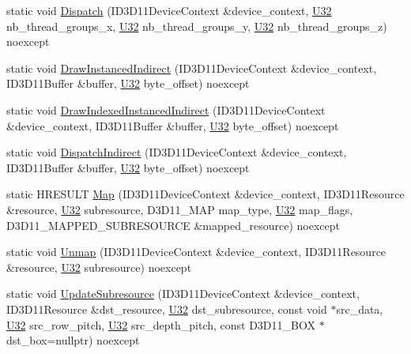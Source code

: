 \begin{DoxyCompactItemize}
\item 
static void \mbox{\hyperlink{structmage_1_1rendering_1_1_pipeline_a96bbf2861a3d4c10ba87c6b6f5228595}{Dispatch}} (I\+D3\+D11\+Device\+Context \&device\+\_\+context, \mbox{\hyperlink{namespacemage_a41c104c036fba3756a74e19f793eeaa1}{U32}} nb\+\_\+thread\+\_\+groups\+\_\+x, \mbox{\hyperlink{namespacemage_a41c104c036fba3756a74e19f793eeaa1}{U32}} nb\+\_\+thread\+\_\+groups\+\_\+y, \mbox{\hyperlink{namespacemage_a41c104c036fba3756a74e19f793eeaa1}{U32}} nb\+\_\+thread\+\_\+groups\+\_\+z) noexcept
\item 
static void \mbox{\hyperlink{structmage_1_1rendering_1_1_pipeline_acfdf1d2aba1e8c0db9c4ef9e9730f31c}{Draw\+Instanced\+Indirect}} (I\+D3\+D11\+Device\+Context \&device\+\_\+context, I\+D3\+D11\+Buffer \&buffer, \mbox{\hyperlink{namespacemage_a41c104c036fba3756a74e19f793eeaa1}{U32}} byte\+\_\+offset) noexcept
\item 
static void \mbox{\hyperlink{structmage_1_1rendering_1_1_pipeline_a51e2744827cbcf7791fcb40c0131d11b}{Draw\+Indexed\+Instanced\+Indirect}} (I\+D3\+D11\+Device\+Context \&device\+\_\+context, I\+D3\+D11\+Buffer \&buffer, \mbox{\hyperlink{namespacemage_a41c104c036fba3756a74e19f793eeaa1}{U32}} byte\+\_\+offset) noexcept
\item 
static void \mbox{\hyperlink{structmage_1_1rendering_1_1_pipeline_aceae5a9f2d24336e4424208a8e037a82}{Dispatch\+Indirect}} (I\+D3\+D11\+Device\+Context \&device\+\_\+context, I\+D3\+D11\+Buffer \&buffer, \mbox{\hyperlink{namespacemage_a41c104c036fba3756a74e19f793eeaa1}{U32}} byte\+\_\+offset) noexcept
\item 
static H\+R\+E\+S\+U\+LT \mbox{\hyperlink{structmage_1_1rendering_1_1_pipeline_ab0176557cd5473bf5cd77836ca2d924f}{Map}} (I\+D3\+D11\+Device\+Context \&device\+\_\+context, I\+D3\+D11\+Resource \&resource, \mbox{\hyperlink{namespacemage_a41c104c036fba3756a74e19f793eeaa1}{U32}} subresource, D3\+D11\+\_\+\+M\+AP map\+\_\+type, \mbox{\hyperlink{namespacemage_a41c104c036fba3756a74e19f793eeaa1}{U32}} map\+\_\+flags, D3\+D11\+\_\+\+M\+A\+P\+P\+E\+D\+\_\+\+S\+U\+B\+R\+E\+S\+O\+U\+R\+CE \&mapped\+\_\+resource) noexcept
\item 
static void \mbox{\hyperlink{structmage_1_1rendering_1_1_pipeline_ac4ad95111168cc62686da885da9ab161}{Unmap}} (I\+D3\+D11\+Device\+Context \&device\+\_\+context, I\+D3\+D11\+Resource \&resource, \mbox{\hyperlink{namespacemage_a41c104c036fba3756a74e19f793eeaa1}{U32}} subresource) noexcept
\item 
static void \mbox{\hyperlink{structmage_1_1rendering_1_1_pipeline_ae1de65a4f77e4db1fe0582ab85ef1335}{Update\+Subresource}} (I\+D3\+D11\+Device\+Context \&device\+\_\+context, I\+D3\+D11\+Resource \&dst\+\_\+resource, \mbox{\hyperlink{namespacemage_a41c104c036fba3756a74e19f793eeaa1}{U32}} dst\+\_\+subresource, const void $\ast$src\+\_\+data, \mbox{\hyperlink{namespacemage_a41c104c036fba3756a74e19f793eeaa1}{U32}} src\+\_\+row\+\_\+pitch, \mbox{\hyperlink{namespacemage_a41c104c036fba3756a74e19f793eeaa1}{U32}} src\+\_\+depth\+\_\+pitch, const D3\+D11\+\_\+\+B\+OX $\ast$dst\+\_\+box=nullptr) noexcept

\end{DoxyCompactItemize}
